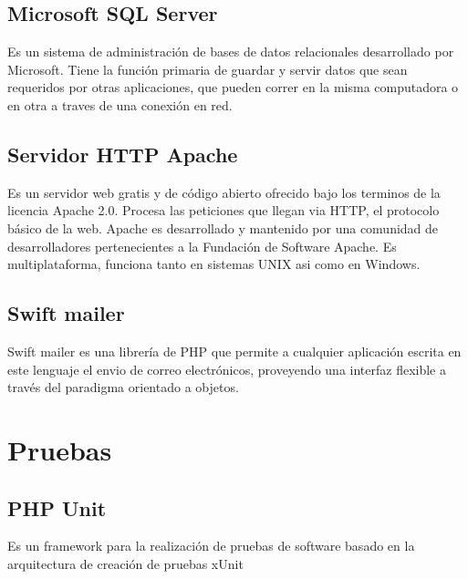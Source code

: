 \subsection{Microsoft SQL Server}

Es un sistema de administración de bases de datos relacionales desarrollado por Microsoft. Tiene la función primaria de guardar y servir datos  que sean requeridos por otras aplicaciones, que pueden correr en la misma computadora o en otra a traves de una conexión en red.

\subsection{Servidor HTTP Apache}

Es un servidor web gratis y de código abierto ofrecido bajo los terminos de la licencia Apache 2.0. Procesa las peticiones que llegan via HTTP, el protocolo básico de la web. Apache es desarrollado y mantenido  por una comunidad de desarrolladores pertenecientes a la Fundación de Software Apache. Es multiplataforma, funciona tanto en sistemas UNIX asi como en Windows.

\subsection{Swift mailer}
Swift mailer es una librería de PHP que permite a cualquier aplicación escrita en este lenguaje el envio de correo electrónicos, proveyendo una interfaz flexible a través del paradigma orientado a objetos.

\section{Pruebas}

\subsection{PHP Unit}

Es un framework para la realización de pruebas de software basado en la arquitectura de creación de pruebas xUnit





